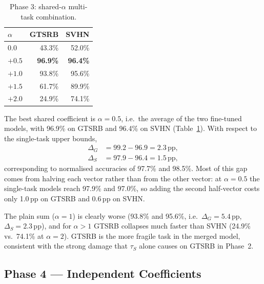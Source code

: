 \documentclass[11pt,a4paper,twocolumn]{article}
\newcommand{\tS}{\tau_S}
\newcommand{\pp}{\,pp}
\begin{document}
\begin{table}[t]
\centering\small
\begin{tabular}{@{}lrr@{}}
\toprule
$\alpha$ & GTSRB & SVHN \\
\midrule
$0.0$ & 43.3\% & 52.0\% \\
$+0.5$ & \textbf{96.9\%} & \textbf{96.4\%} \\
$+1.0$ & 93.8\% & 95.6\% \\
$+1.5$ & 61.7\% & 89.9\% \\
$+2.0$ & 24.9\% & 74.1\% \\
\bottomrule
\end{tabular}
\caption{Phase 3: shared-$\alpha$ multi-task combination.}
\label{tab:phase3}
\end{table}

The best shared coefficient is $\alpha=0.5$, i.e.\ the average of the two
fine-tuned models, with 96.9\% on GTSRB and 96.4\% on SVHN
(Table~\ref{tab:phase3}). With respect to the single-task upper bounds,
\begin{align*}
\Delta_G &= 99.2-96.9 = 2.3\,\text{pp},\\
\Delta_S &= 97.9-96.4 = 1.5\,\text{pp},
\end{align*}
corresponding to normalised accuracies of 97.7\% and 98.5\%. Most of this
gap comes from halving each vector rather than from the other vector: at
$\alpha=0.5$ the single-task models reach 97.9\% and 97.0\%, so adding the
second half-vector costs only 1.0\pp{} on GTSRB and 0.6\pp{} on SVHN.

The plain sum ($\alpha=1$) is clearly worse (93.8\% and 95.6\%, i.e.\
$\Delta_G=5.4$\pp, $\Delta_S=2.3$\pp), and for $\alpha>1$ GTSRB collapses
much faster than SVHN (24.9\% vs.\ 74.1\% at $\alpha=2$). GTSRB is the more
fragile task in the merged model, consistent with the strong damage that
$\tS$ alone causes on GTSRB in Phase~2.

\subsection{Phase 4 --- Independent Coefficients}
\end{document}

